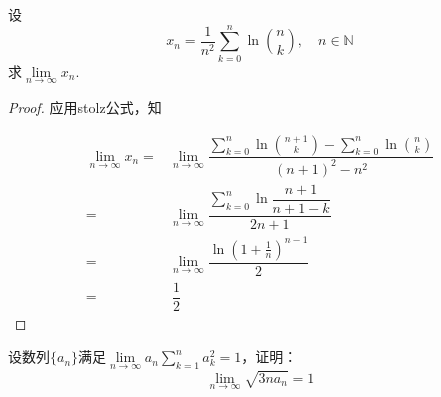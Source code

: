 \begin{proposition}
    
    设
    $$x_n = \dfrac{1}{n^2} \sum\limits_{k = 0}^{n}{\ln{\binom{n}{k}}}, \quad n \in \mathbb{N}$$
    求$\lim\limits_{n \to \infty}{x_n}$.

\end{proposition}

\begin{proof}
    
    应用\textup{stolz}公式，知

    \begin{align*}
        \lim\limits_{n \to \infty}{x_n}  = & \lim\limits_{n \to \infty}{\dfrac{\sum\limits_{k = 0}^{n}{\ln{\binom{n + 1}{k}}} - \sum\limits_{k = 0}^{n}{\ln{\binom{n}{k}}}}{(n + 1)^2 - n^2}} \\
        = & \lim\limits_{n \to \infty}{\dfrac{\sum\limits_{k = 0}^{n}{\ln{\dfrac{n + 1}{n + 1 - k}}}}{2n + 1}} \\
        = & \lim\limits_{n \to \infty}{\dfrac{\ln{(1 + \frac{1}{n})^{n - 1}}}{2}} \\
        = & \ \dfrac{1}{2}
    \end{align*}

\end{proof}

\begin{proposition}
    
    设数列$\{a_n\}$满足$\lim\limits_{n \to \infty}{a_n \sum\limits_{k  = 1}^{n}{a_k^2}} = 1$，证明：
    $$\lim\limits_{n \to \infty}{\sqrt{3na_n}} = 1$$

\end{proposition}

